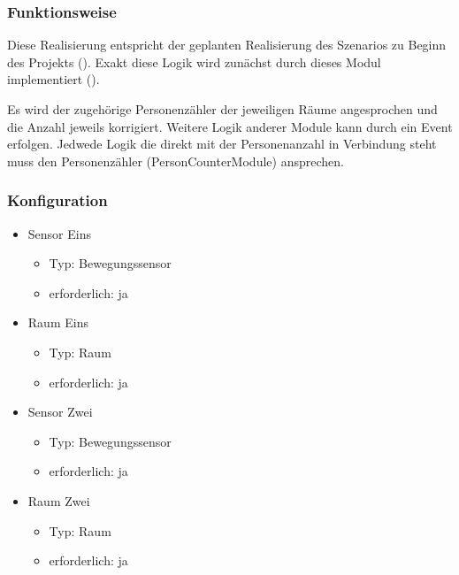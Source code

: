 \subsubsection{Funktionsweise}
Diese Realisierung entspricht der geplanten Realisierung des Szenarios zu Beginn des Projekts (). Exakt diese Logik wird zunächst durch dieses Modul implementiert ().

Es wird der zugehörige Personenzähler der jeweiligen Räume angesprochen und die Anzahl jeweils korrigiert. Weitere Logik anderer Module kann durch ein Event erfolgen. Jedwede Logik die direkt mit der Personenanzahl in Verbindung steht muss den Personenzähler (PersonCounterModule) ansprechen.

\subsubsection{Konfiguration}
\begin{itemize}
	\item Sensor Eins
	\begin{itemize}
		\item Typ: Bewegungssensor
		\item erforderlich: ja
	\end{itemize}
	
	\item Raum Eins
	\begin{itemize}
		\item Typ: Raum
		\item erforderlich: ja
	\end{itemize}

	\item Sensor Zwei
	\begin{itemize}
		\item Typ: Bewegungssensor
		\item erforderlich: ja
	\end{itemize}
	
	\item Raum Zwei
	\begin{itemize}
		\item Typ: Raum
		\item erforderlich: ja
	\end{itemize}
\end{itemize}


